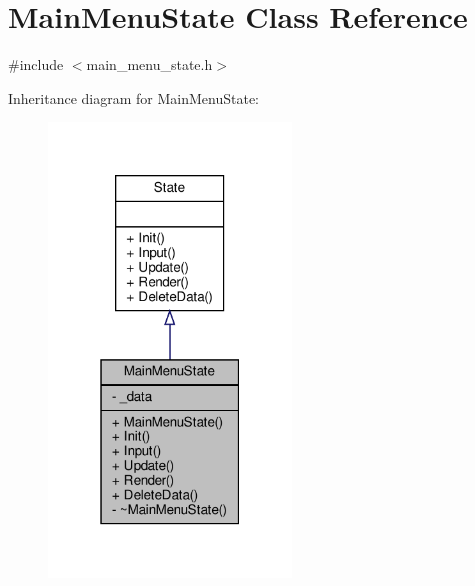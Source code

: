 \hypertarget{classMainMenuState}{}\section{Main\+Menu\+State Class Reference}
\label{classMainMenuState}


{\ttfamily \#include $<$main\+\_\+menu\+\_\+state.\+h$>$}



Inheritance diagram for Main\+Menu\+State\+:
\nopagebreak
\begin{figure}[H]
\begin{center}
\leavevmode
\includegraphics[width=183pt]{classMainMenuState__inherit__graph}
\end{center}
\end{figure}


